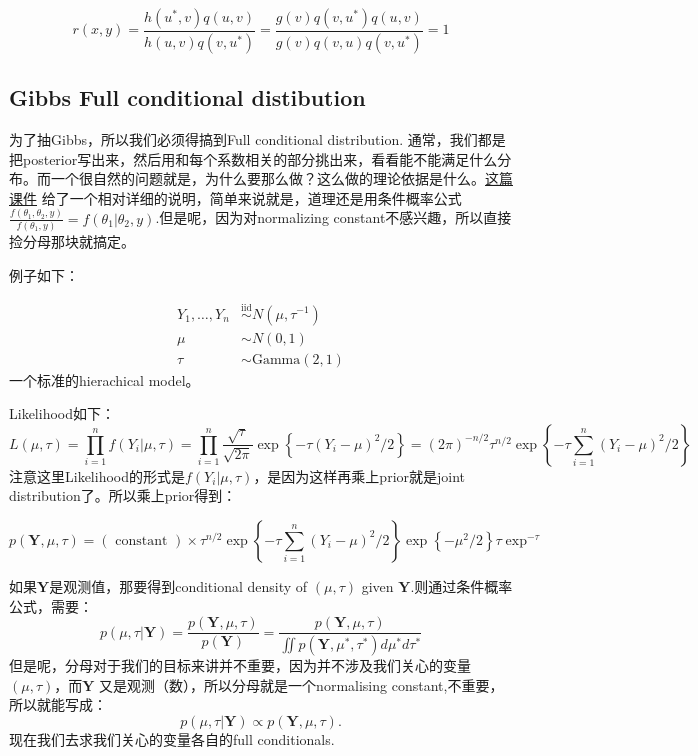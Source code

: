\documentclass[
]{book}
\theoremstyle{definition}
\theoremstyle{definition}
\theoremstyle{definition}
\theoremstyle{remark}
\begin{document}
\[
r(x, y)=\frac{h\left(u^{*}, v\right) q(u, v)}{h(u, v) q\left(v, u^{*}\right)}=\frac{g(v) q\left(v, u^{*}\right) q(u, v)}{g(v) q(v, u) q\left(v, u^{*}\right)}=1
\]

\hypertarget{gibbs-full-conditional-distibution}{%
\subsection{Gibbs Full conditional distibution}\label{gibbs-full-conditional-distibution}}

为了抽Gibbs，所以我们必须得搞到Full conditional distribution. 通常，我们都是把posterior写出来，然后用和每个系数相关的部分挑出来，看看能不能满足什么分布。而一个很自然的问题就是，为什么要那么做？这么做的理论依据是什么。\href{http://personal.psu.edu/drh20/515/hw/MCMCexample.pdf}{这篇课件} 给了一个相对详细的说明，简单来说就是，道理还是用条件概率公式\(\frac{f(\theta_1,\theta_2,y)}{f(\theta_1,y)}=f(\theta_1|\theta_2,y)\).但是呢，因为对normalizing constant不感兴趣，所以直接捡分母那块就搞定。

例子如下：

\[
\begin{aligned} Y_{1}, \ldots, Y_{n} & \stackrel{\mathrm{iid}}{\sim}  N\left(\mu, \tau^{-1}\right) \\ \mu & \sim  N(0,1) \\ \tau & \sim  \mathrm{Gamma}(2,1) \end{aligned}
\]
一个标准的hierachical model。

Likelihood如下：
\[
L(\mu, \tau)=\prod_{i=1}^{n} f\left(Y_{i} | \mu, \tau\right)=\prod_{i=1}^{n} \frac{\sqrt{\tau}}{\sqrt{2 \pi}} \exp \left\{-\tau\left(Y_{i}-\mu\right)^{2} / 2\right\}=(2 \pi)^{-n / 2} \tau^{n / 2} \exp \left\{-\tau \sum_{i=1}^{n}\left(Y_{i}-\mu\right)^{2} / 2\right\}
\]
注意这里Likelihood的形式是\(f(Y_i|\mu,\tau)\)，是因为这样再乘上prior就是joint distribution了。所以乘上prior得到：

\[
p(\mathbf{Y}, \mu, \tau)=(\text { constant }) \times \tau^{n / 2} \exp \left\{-\tau \sum_{i=1}^{n}\left(Y_{i}-\mu\right)^{2} / 2\right\} \exp \left\{-\mu^{2} / 2\right\} \tau \exp ^{-\tau}
\]

如果\(\mathbf{Y}\)是观测值，那要得到conditional density of \((\mu,\tau)\) given \(\mathbf Y\).则通过条件概率公式，需要：
\[
p(\mu, \tau | \mathbf{Y})=\frac{p(\mathbf{Y}, \mu, \tau)}{p(\mathbf{Y})}=\frac{p(\mathbf{Y}, \mu, \tau)}{\iint p\left(\mathbf{Y}, \mu^{*}, \tau^{*}\right) d \mu^{*} d \tau^{*}}
\]
但是呢，分母对于我们的目标来讲并不重要，因为并不涉及我们关心的变量\((\mu,\tau)\)，而\(\mathbf{Y}\) 又是观测（数），所以分母就是一个normalising constant,不重要，所以就能写成：
\[
p(\mu, \tau | \mathbf{Y}) \propto p(\mathbf{Y}, \mu, \tau).
\]
现在我们去求我们关心的变量各自的full conditionals.
\end{document}
